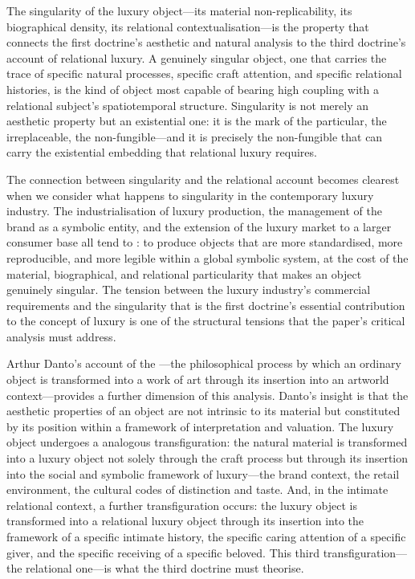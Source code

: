 \begin{claim}
The singularity of the luxury object---its material non-replicability, its biographical density, its relational contextualisation---is the property that connects the first doctrine's aesthetic and natural analysis to the third doctrine's account of relational luxury. A genuinely singular object, one that carries the trace of specific natural processes, specific craft attention, and specific relational histories, is the kind of object most capable of bearing high coupling with a relational subject's spatiotemporal structure. Singularity is not merely an aesthetic property but an existential one: it is the mark of the particular, the irreplaceable, the non-fungible---and it is precisely the non-fungible that can carry the existential embedding that relational luxury requires.
\end{claim}

The connection between singularity and the relational account becomes clearest when we consider what happens to singularity in the contemporary luxury industry. The industrialisation of luxury production, the management of the brand as a symbolic entity, and the extension of the luxury market to a larger consumer base all tend to : to produce objects that are more standardised, more reproducible, and more legible within a global symbolic system, at the cost of the material, biographical, and relational particularity that makes an object genuinely singular. The tension between the luxury industry's commercial requirements and the singularity that is the first doctrine's essential contribution to the concept of luxury is one of the structural tensions that the paper's critical analysis must address.

Arthur Danto's account of the  \parencite{danto1981}---the philosophical process by which an ordinary object is transformed into a work of art through its insertion into an artworld context---provides a further dimension of this analysis. Danto's insight is that the aesthetic properties of an object are not intrinsic to its material but constituted by its position within a framework of interpretation and valuation. The luxury object undergoes a analogous transfiguration: the natural material is transformed into a luxury object not solely through the craft process but through its insertion into the social and symbolic framework of luxury---the brand context, the retail environment, the cultural codes of distinction and taste. And, in the intimate relational context, a further transfiguration occurs: the luxury object is transformed into a relational luxury object through its insertion into the framework of a specific intimate history, the specific caring attention of a specific giver, and the specific receiving of a specific beloved. This third transfiguration---the relational one---is what the third doctrine must theorise.
